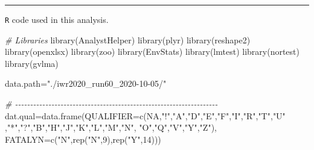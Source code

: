 \documentclass[]{interact}
\theoremstyle{plain}%
\theoremstyle{definition}
\theoremstyle{remark}
\newenvironment{Shaded}{\begin{snugshade}}{\end{snugshade}}
\newcommand{\AttributeTok}[1]{\textcolor[rgb]{0.77,0.63,0.00}{#1}}
\newcommand{\CommentTok}[1]{\textcolor[rgb]{0.56,0.35,0.01}{\textit{#1}}}
\newcommand{\ConstantTok}[1]{\textcolor[rgb]{0.00,0.00,0.00}{#1}}
\newcommand{\DecValTok}[1]{\textcolor[rgb]{0.00,0.00,0.81}{#1}}
\newcommand{\FunctionTok}[1]{\textcolor[rgb]{0.00,0.00,0.00}{#1}}
\newcommand{\NormalTok}[1]{#1}
\newcommand{\OtherTok}[1]{\textcolor[rgb]{0.56,0.35,0.01}{#1}}
\newcommand{\StringTok}[1]{\textcolor[rgb]{0.31,0.60,0.02}{#1}}
\begin{document}
\begin{center}\rule{0.5\linewidth}{0.5pt}\end{center}

\texttt{R} code used in this analysis.

\begin{Shaded}
\begin{Highlighting}[]
\CommentTok{\# Libraries}
\FunctionTok{library}\NormalTok{(AnalystHelper)}
\FunctionTok{library}\NormalTok{(plyr)}
\FunctionTok{library}\NormalTok{(reshape2)}
\FunctionTok{library}\NormalTok{(openxlsx)}
\FunctionTok{library}\NormalTok{(zoo)}
\FunctionTok{library}\NormalTok{(EnvStats)}
\FunctionTok{library}\NormalTok{(lmtest)}
\FunctionTok{library}\NormalTok{(nortest)}
\FunctionTok{library}\NormalTok{(gvlma)}

\NormalTok{data.path}\OtherTok{=}\StringTok{"./iwr2020\_run60\_2020{-}10{-}05/"}

\CommentTok{\# {-}{-}{-}{-}{-}{-}{-}{-}{-}{-}{-}{-}{-}{-}{-}{-}{-}{-}{-}{-}{-}{-}{-}{-}{-}{-}{-}{-}{-}{-}{-}{-}{-}{-}{-}{-}{-}{-}{-}{-}{-}{-}{-}{-}{-}{-}{-}{-}{-}{-}{-}{-}{-}{-}{-}{-}{-}{-}{-}{-}{-}{-}{-}{-}{-}{-}{-}}
\NormalTok{dat.qual}\OtherTok{=}\FunctionTok{data.frame}\NormalTok{(}\AttributeTok{QUALIFIER=}\FunctionTok{c}\NormalTok{(}\ConstantTok{NA}\NormalTok{,}\StringTok{"!"}\NormalTok{,}\StringTok{"A"}\NormalTok{,}\StringTok{"D"}\NormalTok{,}\StringTok{"E"}\NormalTok{,}\StringTok{"F"}\NormalTok{,}\StringTok{"I"}\NormalTok{,}\StringTok{"R"}\NormalTok{,}\StringTok{"T"}\NormalTok{,}\StringTok{"U"}
\NormalTok{                                ,}\StringTok{"*"}\NormalTok{,}\StringTok{"?"}\NormalTok{,}\StringTok{"B"}\NormalTok{,}\StringTok{"H"}\NormalTok{,}\StringTok{"J"}\NormalTok{,}\StringTok{"K"}\NormalTok{,}\StringTok{"L"}\NormalTok{,}\StringTok{"M"}\NormalTok{,}\StringTok{"N"}\NormalTok{,}
                                \StringTok{"O"}\NormalTok{,}\StringTok{"Q"}\NormalTok{,}\StringTok{"V"}\NormalTok{,}\StringTok{"Y"}\NormalTok{,}\StringTok{"Z"}\NormalTok{),}
                    \AttributeTok{FATALYN=}\FunctionTok{c}\NormalTok{(}\StringTok{"N"}\NormalTok{,}\FunctionTok{rep}\NormalTok{(}\StringTok{"N"}\NormalTok{,}\DecValTok{9}\NormalTok{),}\FunctionTok{rep}\NormalTok{(}\StringTok{"Y"}\NormalTok{,}\DecValTok{14}\NormalTok{)))}


\end{Highlighting}
\end{Shaded}
\end{document}
